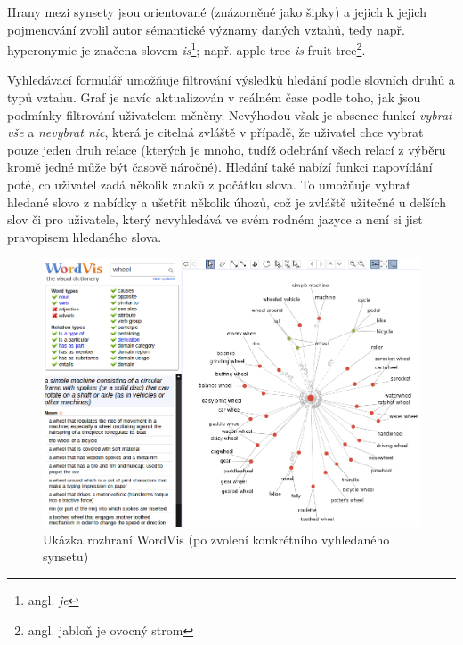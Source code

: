 \documentclass[a4paper, 11pt, oneside]{book}
\newcommand\ex{\textsf}
\begin{document}
				Hrany mezi synsety jsou orientované (znázorněné jako šipky) a jejich k jejich pojmenování zvolil autor sémantické významy daných vztahů, tedy např. hyperonymie je značena slovem \textit{is}\footnote{angl. \textit{je}}; např. \ex{apple tree \textit{is} fruit tree}\footnote{angl. jabloň je ovocný strom}.

				Vyhledávací formulář umožňuje filtrování výsledků hledání podle slovních druhů a typů vztahu. Graf je navíc aktualizován v reálném čase podle toho, jak jsou podmínky filtrování uživatelem měněny. Nevýhodou však je absence funkcí \textit{vybrat vše} a \textit{nevybrat nic}, která je citelná zvláště v případě, že uživatel chce vybrat pouze jeden druh relace (kterých je mnoho, tudíž odebrání všech relací z výběru kromě jedné může být časově náročné). Hledání také nabízí funkci napovídání poté, co uživatel zadá několik znaků z počátku slova. To umožňuje vybrat hledané slovo z nabídky a ušetřit několik úhozů, což je zvláště užitečné u delších slov či pro uživatele, který nevyhledává ve svém rodném jazyce a není si jist pravopisem hledaného slova.

				\begin{figure}[h]
					\centering
					\includegraphics[width=1.0\textwidth]{wordvis.png}
					\caption{Ukázka rozhraní WordVis (po zvolení konkrétního vyhledaného synsetu)}
					\label{fig:wordvis}
				\end{figure}
\end{document}
